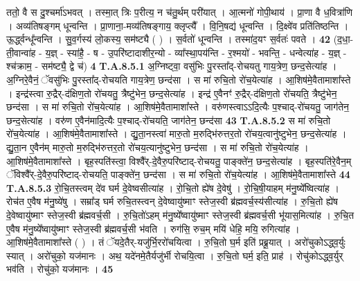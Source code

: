 \documentclass[17pt]{extarticle}
\begin{document}
                  ततो॒ वै स दु॒श्चर्मा॑ऽभवत् । तस्मा॒त् त्रिः प॒रीत्य॒ न च॑तु॒र्थम् परी॑यात् । आ॒त्मनो॑ गोपी॒थाय॑ । प्रा॒णा वै ध॒वित्रा॑णि । अव्य॑तिषङ्गम् धून्वन्ति ।  प्रा॒णाना॒-मव्य॑तिषङ्गाय॒ क्लृप्त्यै᳚ । वि॒नि॒षद्य॑ धून्वन्ति । दि॒क्ष्वे॑व प्रति॑तिष्ठन्ति । ऊ॒र्द्ध्वन्धू᳚न्वन्ति । सु॒व॒र्गस्य॑ लो॒कस्य॒ सम॑ष्ट्यै ( ) । स॒र्वतो॑ धून्वन्ति ।  तस्मा॑द॒यꣳ स॒र्वतः॑ पवते । \textbf{ 42} \newline
                  \newline
                                                        (द॒धा॒- ती॒वान्वा॑ह - य॒ज्ञ् - स्या॑है॒ - ष - उ॒परि॑ष्टादाशीर॒न्यो - व्या᳚स्था॒पय॑न्ति - र॒श्मयो॑ - भवन्ति॒ - धन्वेत्या॑ह - य॒ज्ञ् - श्च॑क्राम॒ - सम॑ष्ट्यै॒ द्वे च॑) \textbf{4} \newline \newline
                                \textbf{ T.A.8.5.1} \newline
                  अ॒ग्निष्ट्वा॒ वसु॑भिः पु॒रस्ता᳚द्-रोचयतु गाय॒त्रेण॒ छन्द॒सेत्या॑ह । अ॒ग्निरे॒वैनं॒ ॅवसु॑भिः पु॒रस्ता᳚द्-रोचयति गाय॒त्रेण॒ छन्द॑सा । स मा॑ रुचि॒तो रो॑च॒येत्या॑ह । आ॒शिष॑मे॒वैतामाशा᳚स्ते ।  इन्द्र॑स्त्वा रु॒द्रैर्-द॑क्षिण॒तो रो॑चयतु॒ त्रैष्टु॑भेन॒  छन्द॒सेत्या॑ह । इन्द्र॑ ए॒वैनꣳ॑ रु॒द्रैर्-द॑क्षिण॒तो रो॑चयति॒ त्रैष्टु॑भेन॒ छन्द॑सा । स मा॑ रुचि॒तो रो॑च॒येत्या॑ह । आ॒शिष॑मे॒वैतामाशा᳚स्ते ।  वरु॑णस्त्वाऽऽदि॒त्यैः प॒श्चाद्-रो॑चयतु॒ जाग॑तेन॒ छन्द॒सेत्या॑ह । वरु॑ण ए॒वैन॑मादि॒त्यैः प॒श्चाद्-रो॑चयति॒ जाग॑तेन॒ छन्द॑सा \textbf{ 43} \newline
                  \newline
                                                                  \textbf{ T.A.8.5.2} \newline
                  स मा॑ रुचि॒तो रो॑च॒येत्या॑ह । आ॒शिष॑मे॒वैतामाशा᳚स्ते ।  द्यु॒ता॒नस्त्वा॑ मारु॒तो म॒रुद्भि॑रुत्तर॒तो रो॑चय॒त्वानु॑ष्टुभेन॒ छन्द॒सेत्या॑ह ।  द्यु॒ता॒न ए॒वैन॑म् मारु॒तो म॒रुद्भि॑रुत्तर॒तो रो॑चय॒त्यानु॑ष्टुभेन॒ छन्द॑सा ।  स मा॑ रुचि॒तो रो॑च॒येत्या॑ह । आ॒शिष॑मे॒वैतामाशा᳚स्ते ।  बृह॒स्पति॑स्त्वा॒ विश्वै᳚र्-दे॒वैरु॒परि॑ष्टाद्-रोचयतु॒ पाङ्क्ते॑न॒ छन्द॒सेत्या॑ह ।  बृह॒स्पति॑रे॒वैन॒म् ॅविश्वै᳚र्-दे॒वैरु॒परि॑ष्टाद्-रोचयति॒ पाङ्क्ते॑न॒ छन्द॑सा ।  स मा॑ रुचि॒तो रो॑च॒येत्या॑ह । आ॒शिष॑मे॒वैतामाशा᳚स्ते \textbf{ 44} \newline
                  \newline
                                                                  \textbf{ T.A.8.5.3} \newline
                  रो॒चि॒तस्त्वम् दे॑व घर्म दे॒वेष्वसीत्या॑ह । रो॒चि॒तो ह्ये॑ष दे॒वेषु॑ । रो॒चि॒षी॒याहम् म॑नु॒ष्ये᳚ष्वित्या॑ह । रोच॑त ए॒वैष म॑नु॒ष्ये॑षु । सम्रा᳚ड् घर्म रुचि॒तस्त्वन् दे॒वेष्वायु॑ष्माꣳ स्तेज॒स्वी ब्र॑ह्मवर्च॒स्य॑सीत्या॑ह ।  रु॒चि॒तो ह्ये॑ष दे॒वेष्वायु॑ष्माꣳ स्तेज॒स्वी ब्र॑ह्मवर्च॒सी ।  रु॒चि॒तो॑ऽहम् म॑नु॒ष्ये᳚ष्वायु॑ष्माꣳ स्तेज॒स्वी ब्र॑ह्मवर्च॒सी भू॑यास॒मित्या॑ह ।  रु॒चि॒त ए॒वैष म॑नु॒ष्ये᳚ष्वायु॑ष्माꣳ स्तेज॒स्वी ब्र॑ह्मवर्च॒सी भ॑वति । रुग॑सि॒ रुच॒म् मयि॑ धेहि॒ मयि॒ रुगित्या॑ह । आ॒शिष॑मे॒वैतामाशा᳚स्ते ( ) ।  तं ॅयदे॒तैर्-यजु॑र्भि॒ररो॑चयित्वा । रु॒चि॒तो घ॒र्म इति॑ प्रब्रू॒यात् । अरो॑चुकोऽद्ध्व॒र्युः स्यात् ।  अरो॑चुको॒ यज॑मानः । अथ॒ यदे॑नमे॒तैर्यजु॑र्भी रोचयि॒त्वा । रु॒चि॒तो घर्म॒ इति॒ प्राह॑ । रोचु॑कोऽद्ध्व॒र्युर् भव॑ति । रोचु॑को॒ यज॑मानः । \textbf{ 45} \newline
\end{document}

